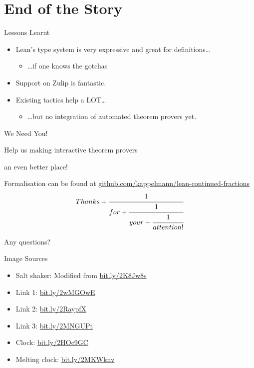 \documentclass{beamer}
\begin{document}
\section{End of the Story}
\begin{frame}{Lessons Learnt}
\pause
\begin{itemize}[<+->]
\item Lean's type system is very expressive and great for definitions\dots
\begin{itemize}
\item \dots if one knows the gotchas
\end{itemize}
\item Support on Zulip is fantastic.
\item Existing tactics help a LOT\dots
\begin{itemize}
\item \dots but no integration of automated theorem provers yet.
\end{itemize}
\end{itemize}
\end{frame}
\begin{frame}{We Need You!}
\Large
\centerline{\alert{Help us making interactive theorem provers}}

\centerline{\alert{an even better place!}}

\end{frame}
\begin{frame}[standout]
\normalsize{Formalisation can be found at \url{github.com/kappelmann/lean-continued-fractions}}
\pause
\center
\begin{equation*}
Thanks + \cfrac{1}{for + \cfrac{1}{your + \cfrac{1}{attention!}}}
\end{equation*}

\vspace{10mm}

\pause
\Large{\alert{Any questions?}}
\end{frame}

\begin{frame}[allowframebreaks]{Image Sources}
\begin{itemize}
\item Salt shaker: Modified from \url{bit.ly/2K8Jw8s}
\item Link 1: \url{bit.ly/2wMGOwE}
\item Link 2: \url{bit.ly/2RaypfX}
\item Link 3: \url{bit.ly/2MNGUPt}
\item Clock: \url{bit.ly/2HOc9GC}
\item Melting clock: \url{bit.ly/2MKWknv}
\end{itemize}
\end{frame}
\end{document}
